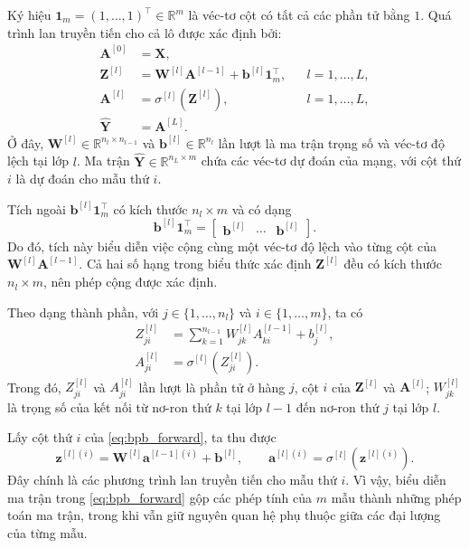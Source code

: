 Ký hiệu $\mathbf{1}_m=(1,\ldots,1)^\top\in\mathbb{R}^m$ là véc-tơ cột có tất cả các phần tử bằng $1$. Quá trình lan truyền tiến cho cả lô được xác định bởi:
\begin{equation}
\label{eq:bpb_forward}
\begin{aligned}
\mathbf{A}^{[0]} &= \mathbf{X},\\
\mathbf{Z}^{[l]} &= \mathbf{W}^{[l]}\mathbf{A}^{[l-1]}
                 + \mathbf{b}^{[l]}\mathbf{1}_m^\top,
                 && l=1,\ldots,L,\\
\mathbf{A}^{[l]} &= \sigma^{[l]}\!\left(\mathbf{Z}^{[l]}\right),
                 && l=1,\ldots,L,\\
\widehat{\mathbf{Y}} &= \mathbf{A}^{[L]}.
\end{aligned}
\end{equation}
Ở đây, $\mathbf{W}^{[l]}\in\mathbb{R}^{n_l\times n_{l-1}}$ và $\mathbf{b}^{[l]}\in\mathbb{R}^{n_l}$ lần lượt là ma trận trọng số và véc-tơ độ lệch tại lớp $l$.
Ma trận $\widehat{\mathbf{Y}}\in\mathbb{R}^{n_L\times m}$ chứa các véc-tơ dự đoán của mạng, với cột thứ $i$ là dự đoán cho mẫu thứ $i$.

Tích ngoài $\mathbf{b}^{[l]}\mathbf{1}_m^\top$ có kích thước
$n_l\times m$ và có dạng
\[ \mathbf{b}^{[l]}\mathbf{1}_m^\top
=\begin{bmatrix}
\mathbf{b}^{[l]} & \cdots & \mathbf{b}^{[l]}
\end{bmatrix}.\]
Do đó, tích này biểu diễn việc cộng cùng một véc-tơ độ lệch vào từng cột của $\mathbf{W}^{[l]}\mathbf{A}^{[l-1]}$.
Cả hai số hạng trong biểu thức xác định $\mathbf{Z}^{[l]}$ đều có kích thước $n_l\times m$, nên phép cộng được xác định.

Theo dạng thành phần, với $j\in\{1,\ldots,n_l\}$ và
$i\in\{1,\ldots,m\}$, ta có
\begin{equation}
\label{eq:bpb_forward_component}
\begin{aligned}
Z_{ji}^{[l]}
&=\sum_{k=1}^{n_{l-1}}W_{jk}^{[l]}A_{ki}^{[l-1]}+b_j^{[l]},\\
A_{ji}^{[l]}
&=\sigma^{[l]}\!\left(Z_{ji}^{[l]}\right).
\end{aligned}
\end{equation}
Trong đó, $Z_{ji}^{[l]}$ và $A_{ji}^{[l]}$ lần lượt là phần tử
ở hàng $j$, cột $i$ của $\mathbf{Z}^{[l]}$ và $\mathbf{A}^{[l]}$;
$W_{jk}^{[l]}$ là trọng số của kết nối từ nơ-ron thứ $k$ tại
lớp $l-1$ đến nơ-ron thứ $j$ tại lớp $l$.

Lấy cột thứ $i$ của \eqref{eq:bpb_forward}, ta thu được
\[\mathbf{z}^{[l](i)}
=\mathbf{W}^{[l]}\mathbf{a}^{[l-1](i)}+\mathbf{b}^{[l]},
\qquad \mathbf{a}^{[l](i)}
=\sigma^{[l]}\!\left(\mathbf{z}^{[l](i)}\right).\]
Đây chính là các phương trình lan truyền tiến cho mẫu thứ $i$. Vì vậy, biểu diễn ma trận trong \eqref{eq:bpb_forward} gộp các phép tính của $m$ mẫu thành những phép toán ma trận, trong khi vẫn giữ nguyên quan hệ phụ thuộc giữa các đại lượng của từng mẫu.

